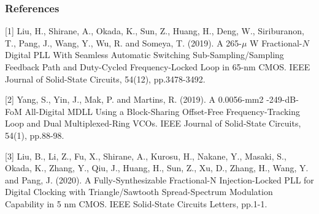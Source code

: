 \documentclass[t, screen, aspectratio=43]{beamer}
\begin{document}



\begin{frame}
	\frametitle{References}
		\scriptsize
		[1]  Liu, H., Shirane, A., Okada, K., Sun, Z., Huang, H., Deng, W., Siriburanon, T., Pang, J., Wang, Y., Wu, R. and Someya, T. (2019). A 265-$\mu$ W Fractional-${N}$ Digital PLL With Seamless Automatic Switching Sub-Sampling/Sampling Feedback Path and Duty-Cycled Frequency-Locked Loop in 65-nm CMOS. IEEE Journal of Solid-State Circuits, 54(12), pp.3478-3492.\par
		\vspace{0.5em}
		[2] Yang, S., Yin, J., Mak, P. and Martins, R. (2019). A 0.0056-mm2 -249-dB-FoM All-Digital MDLL Using a Block-Sharing Offset-Free Frequency-Tracking Loop and Dual Multiplexed-Ring VCOs. IEEE Journal of Solid-State Circuits, 54(1), pp.88-98.\par
		\vspace{0.5em}
		[3] Liu, B., Li, Z., Fu, X., Shirane, A., Kurosu, H., Nakane, Y., Masaki, S., Okada, K., Zhang, Y., Qiu, J., Huang, H., Sun, Z., Xu, D., Zhang, H., Wang, Y. and Pang, J. (2020). A Fully-Synthesizable Fractional-N Injection-Locked PLL for Digital Clocking with Triangle/Sawtooth Spread-Spectrum Modulation Capability in 5 nm CMOS. IEEE Solid-State Circuits Letters, pp.1-1.
\end{frame}
\end{document}
